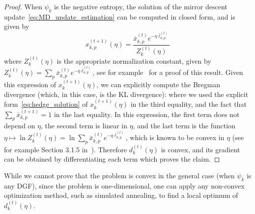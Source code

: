 \documentclass{sig-alternate-ipsn13}
\begin{document}
\begin{proof}
When $\psi_k$ is the negative entropy, the solution of the mirror descent update~\eqref{eq:MD_update_estimation} can be computed in closed form, and is given by
\begin{equation}
\label{eq:hedge_solution}
x^{(t+1)}_{k, p}(\eta) = \frac{\bar x^{(t)}_{k, p} e^{-\eta \bar \ell^{(t)}_{k, p}} }{ Z_k^{(t)}(\eta) }
\end{equation}
where $Z_k^{(t)}(\eta)$ is the appropriate normalization constant, given by $Z_k^{(t)}(\eta) = \sum_{p}\bar x^{(t)}_{k, p} e^{-\eta \bar \ell^{(t)}_{k, p}}$, see for example~\cite{beck2003mirror} for a proof of this result. Given this expression of $x^{(t+1)}_k(\eta)$, we can explicitly compute the Bregman divergence (which, in this case, is the KL divergence):
where we used the explicit form~\eqref{eq:hedge_solution} of $x^{(t+1)}_k(\eta)$ in the third equality, and the fact that $\sum_{p} \bar x^{(t+1)}_{k, p} = 1$ in the last equality. In this expression, the first term does not depend on $\eta$, the second term is linear in $\eta$, and the last term is the function $\eta \mapsto \ln Z_k^{(t)}(\eta) = \ln \sum_{p}\bar x^{(t)}_{k, p} e^{-\eta \bar \ell^{(t)}_{k, p}}$, which is known to be convex in $\eta$ (see for example Section 3.1.5 in~\cite{boyd2010convex}). Therefore $d^{(t)}_k(\eta)$ is convex, and its gradient can be obtained by differentiating each term
which proves the claim.
\end{proof}
While we cannot prove that the problem is convex in the general case (when $\psi_k$ is any DGF), since the problem is one-dimensional, one can apply any non-convex optimization method, such as simulated annealing, to find a local optimum of $d_k^{(t)}(\eta)$.
\end{document}
